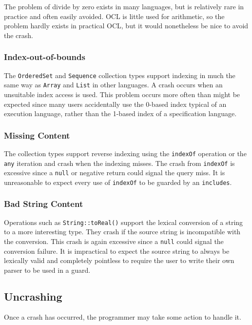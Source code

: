 \documentclass{llncs}
\begin{document}
The problem of divide by zero exists in many languages, but is relatively rare in practice and often easily avoided. OCL is little used for arithmetic, so the problem hardly exists in practical OCL, but it would nonetheless be nice to avoid the crash.

\subsubsection{Index-out-of-bounds}

The \verb|OrderedSet| and \verb|Sequence| collection types support indexing in much the same way as \verb|Array| and \verb|List| in other languages. A crash occurs when an unsuitable index access is used. This problem occurs more often than might be expected since many users accidentally use the 0-based index typical of an execution language, rather than the 1-based index of a specification language.

\subsubsection{Missing Content}

The collection types support reverse indexing using the \verb|indexOf| operation or the \verb|any| iteration and crash when the indexing misses. The crash from \verb|indexOf| is excessive since a \verb|null| or negative return could signal the query miss. It is unreasonable to expect every use of \verb|indexOf| to be guarded by an \verb|includes|.

\subsubsection{Bad String Content}

Operations such as \verb|String::toReal()| support the lexical conversion of a string to a more interesting type. They crash if the source string is incompatible with the conversion. This crash is again excessive since a \verb|null| could signal the conversion failure. It is impractical to expect the source string to always be lexically valid and completely pointless to require the user to write their own parser to be used in a guard.

\subsection{Uncrashing}

Once a crash has occurred, the programmer may take some action to handle it.
\end{document}
